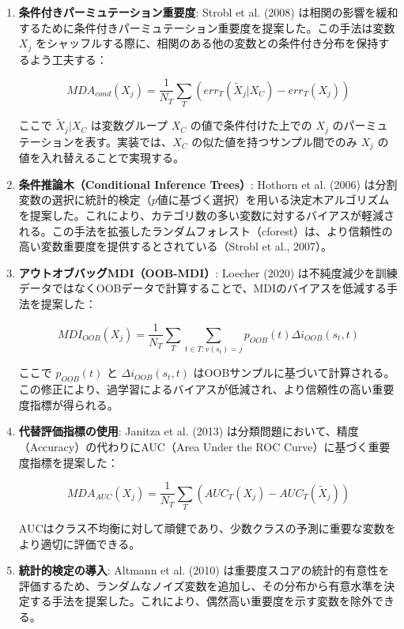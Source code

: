 \documentclass[a4paper,10pt]{ujarticle}
\begin{document}
\begin{enumerate}
\item \textbf{条件付きパーミュテーション重要度}: Strobl et al. (2008) は相関の影響を緩和するために条件付きパーミュテーション重要度を提案した。この手法は変数 $X_j$ をシャッフルする際に、相関のある他の変数との条件付き分布を保持するよう工夫する：

   $$MDA_{cond}(X_j) = \frac{1}{N_T}\sum_{T}\left(err_T(\tilde{X}_j | X_C) - err_T(X_j)\right)$$

   ここで $\tilde{X}_j | X_C$ は変数グループ $X_C$ の値で条件付けた上での $X_j$ のパーミュテーションを表す。実装では、$X_C$ の似た値を持つサンプル間でのみ $X_j$ の値を入れ替えることで実現する。

\item \textbf{条件推論木（Conditional Inference Trees）}: Hothorn et al. (2006) は分割変数の選択に統計的検定（$p$値に基づく選択）を用いる決定木アルゴリズムを提案した。これにより、カテゴリ数の多い変数に対するバイアスが軽減される。この手法を拡張したランダムフォレスト（cforest）は、より信頼性の高い変数重要度を提供するとされている（Strobl et al., 2007）。

\item \textbf{アウトオブバッグMDI（OOB-MDI）}: Loecher (2020) は不純度減少を訓練データではなくOOBデータで計算することで、MDIのバイアスを低減する手法を提案した：

   $$MDI_{OOB}(X_j) = \frac{1}{N_T}\sum_{T}\sum_{t \in T: v(s_t)=j}p_{OOB}(t)\Delta i_{OOB}(s_t, t)$$

   ここで $p_{OOB}(t)$ と $\Delta i_{OOB}(s_t, t)$ はOOBサンプルに基づいて計算される。この修正により、過学習によるバイアスが低減され、より信頼性の高い重要度指標が得られる。

\item \textbf{代替評価指標の使用}: Janitza et al. (2013) は分類問題において、精度（Accuracy）の代わりにAUC（Area Under the ROC Curve）に基づく重要度指標を提案した：

   $$MDA_{AUC}(X_j) = \frac{1}{N_T}\sum_{T}\left(AUC_T(X_j) - AUC_T(\tilde{X}_j)\right)$$

   AUCはクラス不均衡に対して頑健であり、少数クラスの予測に重要な変数をより適切に評価できる。

\item \textbf{統計的検定の導入}: Altmann et al. (2010) は重要度スコアの統計的有意性を評価するため、ランダムなノイズ変数を追加し、その分布から有意水準を決定する手法を提案した。これにより、偶然高い重要度を示す変数を除外できる。
\end{enumerate}
\end{document}
